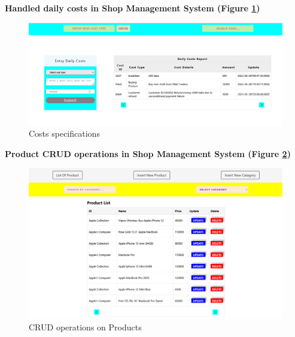 \newpage
\textbf{Handled daily costs in Shop Management System (Figure \ref{fig:fig 6.2.22})}\\

\begin{figure}[ht]
    \centering  
    \includegraphics[width=\textwidth, height=0.8\textheight, keepaspectratio]{designs/costs manufacture.png}    
    \caption{Costs specifications}
    \label{fig:fig 6.2.22}
\end{figure}

\textbf{Product CRUD operations in Shop Management System (Figure \ref{fig:fig 6.2.23})}\\

\begin{figure}[ht]
    \centering  
    \includegraphics[width=\textwidth, height=0.8\textheight, keepaspectratio]{designs/products crud operation.png}    
    \caption{CRUD operations on Products}
    \label{fig:fig 6.2.23}
\end{figure}

